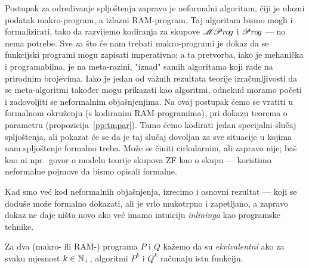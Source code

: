 Postupak za određivanje spljoštenja zapravo je neformalni algoritam, čiji je ulazni podatak makro-program, a izlazni RAM-program. Taj algoritam bismo mogli i formalizirati, tako da razvijemo kodiranja za skupove $\mathscr{MP}r\mspace{-1mu}o\mspace{-2mu}g$ i $\mathscr Pr\mspace{-1mu}o\mspace{-2mu}g$ --- no nema potrebe. Sve za što će nam trebati makro-programi je dokaz da se funkcijski programi mogu zapisati imperativno; a ta pretvorba, iako je mehanička i programabilna, je na meta-razini, "iznad" samih algoritama koji rade na prirodnim brojevima. Iako je jedan od važnih rezultata teorije izračunljivosti da se meta-algoritmi također mogu prikazati kao algoritmi, odnekud moramo početi i zadovoljiti se neformalnim objašnjenjima. 
Na ovaj postupak ćemo se vratiti u formalnom okruženju (s kodiranim RAM-programima), pri dokazu teorema o parametru (propozicija~\ref{pp:tmpar}). Tamo ćemo kodirati jedan specijalni slučaj spljoštenja, ali pokazat će se da je taj slučaj dovoljan za sve situacije u kojima nam spljoštenje formalno treba. Može se činiti cirkularnim, ali zapravo nije; baš kao ni npr.\ govor o modelu teorije skupova ZF kao o skupu --- koristimo neformalne pojmove da bismo opisali formalne.


Kad smo već kod neformalnih objašnjenja, izrecimo i osnovni rezultat --- koji se doduše može formalno dokazati, ali je vrlo mukotrpno i zapetljano, a zapravo dokaz ne daje ništa novo ako već imamo intuiciju \emph{inlininga} kao programske tehnike.

\begin{definicija}[{name=[ekvivalentnost programa]}]\label{def:ekvprog}
Za dva (makro- ili RAM-\!) programa $P$ i $Q$ kažemo da su \emph{ekvivalentni} ako za svaku mjesnost $k\in{\mathbb N}_+$, algoritmi $P^k$ i $Q^k$ računaju istu funkciju.
\end{definicija}

